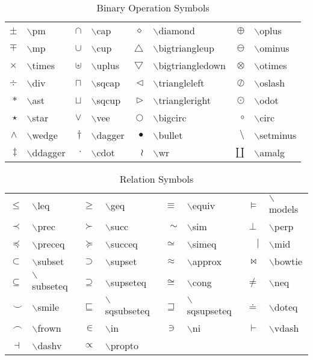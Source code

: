 \begin{table}
\centering
\caption{Binary Operation Symbols}
\vspace{\baselineskip}
\tablerule
\begin{tabular}{rlrlrlrl}
$\pm$&$\backslash$pm&
$\cap$&$\backslash$cap&
$\diamond$&$\backslash$diamond&
$\oplus$&$\backslash$oplus\\
$\mp$&$\backslash$mp&
$\cup$&$\backslash$cup&
$\bigtriangleup$&$\backslash$bigtriangleup&
$\ominus$&$\backslash$ominus\\
$\times$&$\backslash$times&
$\uplus$&$\backslash$uplus&
$\bigtriangledown$&$\backslash$bigtriangledown&
$\otimes$&$\backslash$otimes\\
$\div$&$\backslash$div&
$\sqcap$&$\backslash$sqcap&
$\triangleleft$&$\backslash$triangleleft&
$\oslash$&$\backslash$oslash\\
$\ast$&$\backslash$ast&
$\sqcup$&$\backslash$sqcup&
$\triangleright$&$\backslash$triangleright&
$\odot$&$\backslash$odot\\
$\star$&$\backslash$star&
$\vee$&$\backslash$vee&
$\bigcirc$&$\backslash$bigcirc&
$\circ$&$\backslash$circ\\
$\wedge$&$\backslash$wedge&
$\dagger$&$\backslash$dagger&
$\bullet$&$\backslash$bullet&
$\setminus$&$\backslash$setminus\\
$\ddagger$&$\backslash$ddagger&
$\cdot$&$\backslash$cdot&
$\wr$&$\backslash$wr&
$\amalg$&$\backslash$amalg\\
\end{tabular}
\tablerule
\end{table}
 
\begin{table}
\centering
\caption{Relation Symbols}
\vspace{\baselineskip}
\tablerule
\begin{tabular}{rlrlrlrl}
$\leq$&$\backslash$leq&
$\geq$&$\backslash$geq&
$\equiv$&$\backslash$equiv&
$\models$&$\backslash$models\\
$\prec$&$\backslash$prec&
$\succ$&$\backslash$succ&
$\sim$&$\backslash$sim&
$\perp$&$\backslash$perp\\
$\preceq$&$\backslash$preceq&
$\succeq$&$\backslash$succeq&
$\simeq$&$\backslash$simeq&
$\mid$&$\backslash$mid\\
$\subset$&$\backslash$subset&
$\supset$&$\backslash$supset&
$\approx$&$\backslash$approx&
$\bowtie$&$\backslash$bowtie\\
$\subseteq$&$\backslash$subseteq&
$\supseteq$&$\backslash$supseteq&
$\cong$&$\backslash$cong&
$\neq$&$\backslash$neq\\
$\smile$&$\backslash$smile&
$\sqsubseteq$&$\backslash$sqsubseteq&
$\sqsupseteq$&$\backslash$sqsupseteq&
$\doteq$&$\backslash$doteq\\
$\frown$&$\backslash$frown&
$\in$&$\backslash$in&
$\ni$&$\backslash$ni&
$\vdash$&$\backslash$vdash\\
$\dashv$&$\backslash$dashv&
$\propto$&$\backslash$propto&&&\\
\end{tabular}
\tablerule
\end{table}
 
